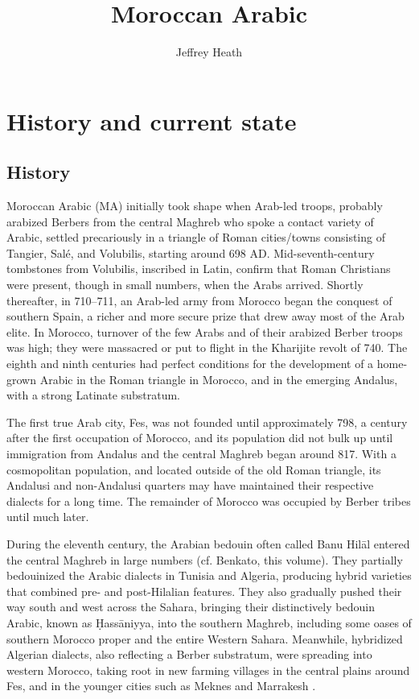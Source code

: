 \documentclass[output=paper]{langsci/langscibook}
\title{Moroccan Arabic}
\author{Jeffrey Heath\affiliation{University of Michigan}}
\begin{document}
\section{History and current state}

\subsection{History}

Moroccan Arabic (MA) initially took shape when Arab-led troops, probably arabized Berbers from the central Maghreb who spoke a contact variety of Arabic, settled precariously in a triangle of Roman cities/towns consisting of Tangier, Salé, and Volubilis, starting around 698 AD. Mid-seventh-century tombstones from Volubilis, inscribed in Latin, confirm that Roman Christians were present, though in small numbers, when the Arabs arrived. Shortly thereafter, in 710–711, an Arab-led army from Morocco began the conquest of southern Spain, a richer and more secure prize that drew away most of the Arab elite. In Morocco, turnover of the few Arabs and of their arabized Berber troops was high; they were massacred or put to flight in the Kharijite revolt of 740. The eighth and ninth centuries had perfect conditions for the development of a home-grown Arabic in the Roman triangle in Morocco, and in the emerging Andalus, with a strong Latinate substratum.  

The first true Arab city, Fes, was not founded until approximately 798, a century after the first occupation of Morocco, and its population did not bulk up until immigration from Andalus and the central Maghreb began around 817. With a cosmopolitan population, and located outside of the old Roman triangle, its Andalusi and non-Andalusi quarters may have maintained their respective dialects for a long time. The remainder of Morocco was occupied by Berber tribes until much later.

During the eleventh century, the Arabian bedouin often called Banu Hilāl entered the central Maghreb in large numbers (cf. Benkato, this volume). They partially bedouinized the Arabic dialects in Tunisia and Algeria, producing hybrid varieties that combined pre- and post-Hilalian features. They also gradually pushed their way south and west across the Sahara, bringing their distinctively bedouin Arabic, known as Ḥassāniyya, into the southern Maghreb, including some oases of southern Morocco proper and the entire Western Sahara. Meanwhile, hybridized Algerian dialects, also reflecting a Berber substratum, were spreading into western Morocco, taking root in new farming villages in the central plains around Fes, and in the younger cities such as Meknes and Marrakesh \citep{Heath2002}.
\end{document}

